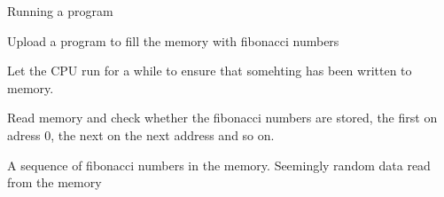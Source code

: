 \test
{Running a program}{
    \item{Upload a program to fill the memory with fibonacci numbers}
    \item{Let the CPU run for a while to ensure that somehting has been written to memory.}
    \item{Read memory and check whether the fibonacci numbers are stored, the first on adress 0, the next on the next address and so on.}
}{A sequence of fibonacci numbers in the memory.}
{Seemingly random data read from the memory}

